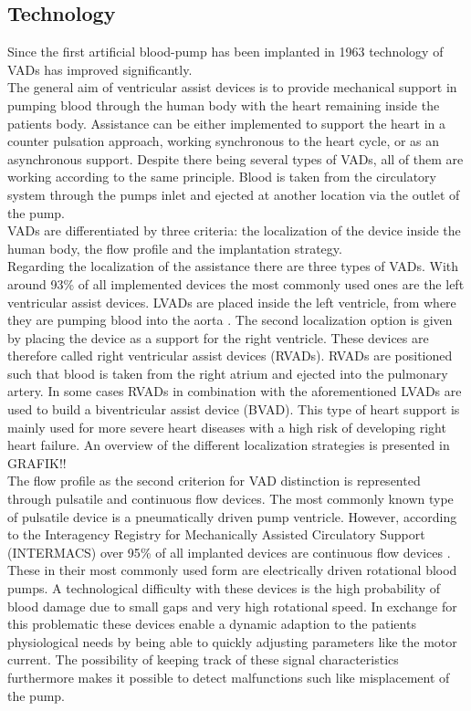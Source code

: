 \subsection{Technology}
Since the first artificial blood-pump has been implanted in 1963 \cite{VAD9} technology of VADs has improved significantly.
\\The general aim of ventricular assist devices is to provide mechanical support in pumping blood through the human body with the heart remaining inside the patients body. Assistance can be either implemented to support the heart in a counter pulsation approach, working synchronous to the heart cycle, or as an asynchronous support. Despite there being several types of VADs, all of them are working according to the same principle. Blood is taken from the circulatory system through the pumps inlet and ejected at another location via the outlet of the pump.\cite{VAD1}
\\VADs are differentiated by three criteria: the localization of the device inside the human body, the flow profile and the implantation strategy.
\\Regarding the localization of the assistance there are three types of VADs. With around 93{\%} of all implemented devices the most commonly used ones are the left ventricular assist devices.\cite{VAD7} LVADs are placed inside the left ventricle, from where they are pumping blood into the aorta \cite{VAD4}. The second localization option is given by placing the device as a support for  the right ventricle. These devices are therefore called right ventricular assist devices (RVADs). RVADs are positioned such that blood is taken from the right atrium and ejected into the pulmonary artery. \cite{VAD7} In some cases RVADs in combination with the aforementioned LVADs are used to build a biventricular assist device (BVAD). This type of heart support is mainly used for more severe heart diseases with a high risk of developing right heart failure. \cite{VAD11} An overview of the different localization strategies is presented in GRAFIK!!
\\The flow profile as the second criterion for VAD distinction is represented through pulsatile and continuous flow devices. The most commonly known type of pulsatile device is a pneumatically driven pump ventricle. \cite{VAD1}
However, according to the Interagency Registry for Mechanically Assisted Circulatory Support (INTERMACS) over 95{\%} of all implanted devices are continuous flow devices \cite{VAD8}. These in their most commonly used form are electrically driven rotational blood pumps. A technological difficulty with these devices is the high probability of blood damage due to small gaps and very high rotational speed. In exchange for this problematic these devices enable a dynamic adaption to the patients physiological needs by being able to quickly adjusting parameters like the motor current. The possibility of keeping track of these signal characteristics furthermore makes it possible to detect malfunctions such like misplacement of the pump. \cite{VAD1}
